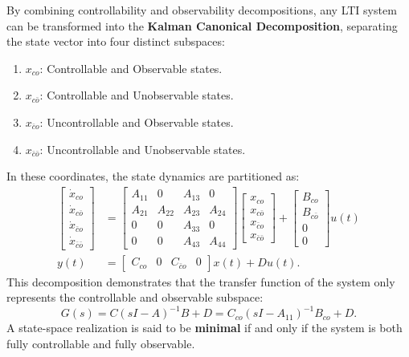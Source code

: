 By combining controllability and observability decompositions, any LTI system can be transformed into the \textbf{Kalman Canonical Decomposition}, separating the state vector into four distinct subspaces:
\begin{enumerate}
    \item $x_{co}$: Controllable and Observable states.
    \item $x_{c\bar{o}}$: Controllable and Unobservable states.
    \item $x_{\bar{c}o}$: Uncontrollable and Observable states.
    \item $x_{\bar{c}\bar{o}}$: Uncontrollable and Unobservable states.
\end{enumerate}
In these coordinates, the state dynamics are partitioned as:
\begin{align}
    \begin{bmatrix} \dot{x}_{co} \\ \dot{x}_{c\bar{o}} \\ \dot{x}_{\bar{c}o} \\ \dot{x}_{\bar{c}\bar{o}} \end{bmatrix} &= \begin{bmatrix}
        A_{11} & 0 & A_{13} & 0 \\
        A_{21} & A_{22} & A_{23} & A_{24} \\
        0 & 0 & A_{33} & 0 \\
        0 & 0 & A_{43} & A_{44}
    \end{bmatrix} \begin{bmatrix} x_{co} \\ x_{c\bar{o}} \\ x_{\bar{c}o} \\ x_{\bar{c}\bar{o}} \end{bmatrix} + \begin{bmatrix} B_{co} \\ B_{c\bar{o}} \\ 0 \\ 0 \end{bmatrix} u(t) \\
y(t) &= \begin{bmatrix} C_{co} & 0 & C_{\bar{c}o} & 0 \end{bmatrix} x(t) + D u(t) .
\end{align}
This decomposition demonstrates that the transfer function of the system only represents the controllable and observable subspace:
\begin{equation}
G(s) = C(sI - A)^{-1} B + D = C_{co}(sI - A_{11})^{-1} B_{co} + D .
\end{equation}
A state-space realization is said to be \textbf{minimal} if and only if the system is both fully controllable and fully observable.

